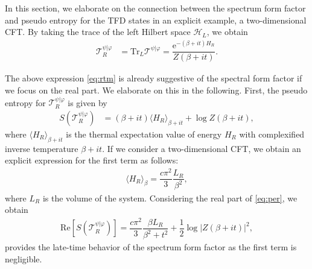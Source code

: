 \documentclass[%
twocolumn, 
secnumarabic,amssymb, preprintnumbers, superscriptaddress, aps, prl]{revtex4-1}
\begin{document}
In this section, we elaborate on the connection between the spectrum form factor and pseudo entropy for the TFD states in an explicit example, a two-dimensional CFT. 
By taking the trace of the left Hilbert space $\mathcal{H}_L$, we obtain
\begin{align}
\mathcal{T}^{\psi|\varphi}_R&=\mathrm{Tr}_L\mathcal{T}^{\psi|\varphi}=\dfrac{\mathrm{e}^{-(\beta+it)H_R }}{Z(\beta+it)}. \label{eq:rtm}
\end{align}

The above expression \eqref{eq:rtm} is already suggestive of the spectral form factor if we focus on the real part. We elaborate on this in the following. First, the pseudo entropy for $\mathcal{T}^{\psi|\varphi}_R$ is given by
\begin{align}
S(\mathcal{T}^{\psi|\varphi}_R)&=(\beta+it)\langle H_R \rangle_{\beta+it}+\log Z(\beta+it), \label{eq:per}
\end{align}
where $\langle H_R \rangle_{\beta+it}$ is the thermal expectation value of energy $H_R$ with complexified inverse temperature $\beta+it$.
If we consider a two-dimensional CFT, we obtain an explicit expression for the first term as follows:
\begin{align}
\langle H_R \rangle_{\beta}=\dfrac{c\pi^2}{3}\dfrac{L_R}{\beta^2}, 
\end{align}
where $L_R$ is the volume of the system.
Considering the real part of \eqref{eq:per}, we obtain
\begin{align}
\mathrm{Re} \left[S(\mathcal{T}^{\psi|\varphi}_R)\right]=\dfrac{c\pi^2}{3}\dfrac{\beta L_R}{\beta^2+t^2}+\dfrac{1}{2}\log |Z(\beta+it)|^2,
\end{align}
provides the late-time behavior of the spectrum form factor as the first term is negligible.  
\end{document}
